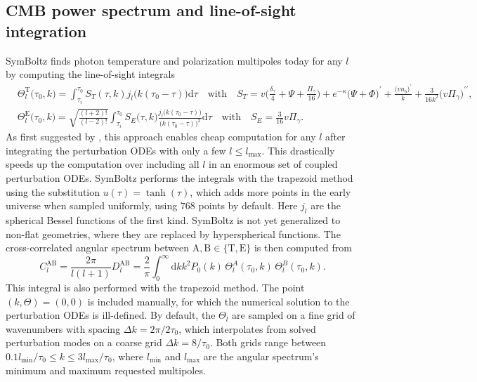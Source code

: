 \documentclass{aa}
\newcommand\TODO[1]{\textcolor{red}{(\textbf{TODO:} #1)}}
\newcommand\lmax{l_\text{max}}
\begin{document}
\subsection{CMB power spectrum and line-of-sight integration}

SymBoltz finds photon temperature and polarization multipoles today for any $l$ by computing the line-of-sight integrals
\label{sec:cmb}
\begin{align*}
    &
    \Theta_l^\mathrm{T}\big(\tau_0,k\big) = \int_{\tau_i}^{\tau_0} S_T(\tau,k) j_l\big(k(\tau_0-\tau)\big) \mathrm{d}\tau \quad \text{with} \quad
    S_T = v \bigg( \frac{\delta_\gamma}{4} + \Psi + \frac{\Pi_\gamma}{16} \bigg) + e^{-\kappa} \big( \Psi + \Phi \big)^\prime + \frac{\big(v u_b\big)^\prime}{k} + \frac{3}{16k^2}\big(v \Pi_\gamma\big)^{\prime\prime}, \\
    &
    \Theta_l^\mathrm{E}\big(\tau_0,k\big) = \sqrt{\frac{(l+2)!}{(l-2)!}} \int_{\tau_i}^{\tau_0} S_E\big(\tau,k\big) \frac{j_l\big(k(\tau_0-\tau)\big)}{\big(k(\tau_0-\tau)\big)^2} \mathrm{d}\tau \quad \text{with} \quad 
    S_E = \frac{3}{16} v \Pi_\gamma .
\end{align*}
As first suggested by \cite{seljakLineSightApproach1996}, this approach enables cheap computation for any $l$ after integrating the perturbation ODEs with only a few $l \leq \lmax$.
This drastically speeds up the computation over including all $l$ in an enormous set of coupled perturbation ODEs.
SymBoltz performs the integrals with the trapezoid method using the substitution $u(\tau) = \tanh(\tau)$, which adds more points in the early universe when sampled uniformly, using $768$ points by default.
Here $j_l$ are the spherical Bessel functions of the first kind.
SymBoltz is not yet generalized to non-flat geometries, where they are replaced by hyperspherical functions.
The cross-correlated angular spectrum between $\mathrm{A},\mathrm{B} \in \{\mathrm{T},\mathrm{E}\}$ is then computed from
\begin{equation*}
    C_l^\mathrm{AB} = \frac{2\pi}{l(l+1)} D_l^\mathrm{AB} = \frac{2}{\pi} \int_0^\infty \mathrm{d}k k^2 P_0(k) \, \Theta_l^A(\tau_0,k) \, \Theta_l^B(\tau_0,k) .
\end{equation*}
This integral is also performed with the trapezoid method.
The point $(k, \Theta) = (0, 0)$ is included manually, for which the numerical solution to the perturbation ODEs is ill-defined.
By default, the $\Theta_l$ are sampled on a fine grid of wavenumbers with spacing $\Delta k = 2\pi/2 \tau_0$, which interpolates from solved perturbation modes on a coarse grid $\Delta k = 8/\tau_0$.
Both grids range between $0.1 l_\text{min}/\tau_0 \leq k \leq 3 l_\text{max}/\tau_0$, where $l_\text{min}$ and $l_\text{max}$ are the angular spectrum's minimum and maximum requested multipoles.
\end{document}
